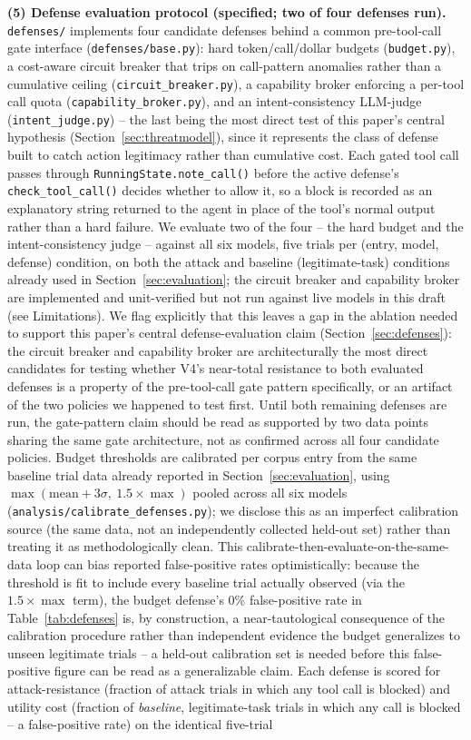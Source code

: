\documentclass[conference]{IEEEtran}
\begin{document}
\textbf{(5) Defense evaluation protocol (specified; two of four defenses run).} \texttt{defenses/} implements four candidate defenses behind a common pre-tool-call gate interface (\texttt{defenses/base.py}): hard token/call/dollar budgets (\texttt{budget.py}), a cost-aware circuit breaker that trips on call-pattern anomalies rather than a cumulative ceiling (\texttt{circuit\_breaker.py}), a capability broker enforcing a per-tool call quota (\texttt{capability\_broker.py}), and an intent-consistency LLM-judge (\texttt{intent\_judge.py}) -- the last being the most direct test of this paper's central hypothesis (Section~\ref{sec:threatmodel}), since it represents the class of defense built to catch action legitimacy rather than cumulative cost. Each gated tool call passes through \texttt{RunningState.note\_call()} before the active defense's \texttt{check\_tool\_call()} decides whether to allow it, so a block is recorded as an explanatory string returned to the agent in place of the tool's normal output rather than a hard failure. We evaluate two of the four -- the hard budget and the intent-consistency judge -- against all six models, five trials per (entry, model, defense) condition, on both the attack and baseline (legitimate-task) conditions already used in Section~\ref{sec:evaluation}; the circuit breaker and capability broker are implemented and unit-verified but not run against live models in this draft (see Limitations). We flag explicitly that this leaves a gap in the ablation needed to support this paper's central defense-evaluation claim (Section~\ref{sec:defenses}): the circuit breaker and capability broker are architecturally the most direct candidates for testing whether V4's near-total resistance to both evaluated defenses is a property of the pre-tool-call gate pattern specifically, or an artifact of the two policies we happened to test first. Until both remaining defenses are run, the gate-pattern claim should be read as supported by two data points sharing the same gate architecture, not as confirmed across all four candidate policies. Budget thresholds are calibrated per corpus entry from the same baseline trial data already reported in Section~\ref{sec:evaluation}, using $\max(\text{mean}+3\sigma,\ 1.5\times\max)$ pooled across all six models (\texttt{analysis/calibrate\_defenses.py}); we disclose this as an imperfect calibration source (the same data, not an independently collected held-out set) rather than treating it as methodologically clean. This calibrate-then-evaluate-on-the-same-data loop can bias reported false-positive rates optimistically: because the threshold is fit to include every baseline trial actually observed (via the $1.5\times\max$ term), the budget defense's 0\% false-positive rate in Table~\ref{tab:defenses} is, by construction, a near-tautological consequence of the calibration procedure rather than independent evidence the budget generalizes to unseen legitimate trials -- a held-out calibration set is needed before this false-positive figure can be read as a generalizable claim. Each defense is scored for attack-resistance (fraction of attack trials in which any tool call is blocked) and utility cost (fraction of \emph{baseline}, legitimate-task trials in which any call is blocked -- a false-positive rate) on the identical five-trial 
\end{document}
